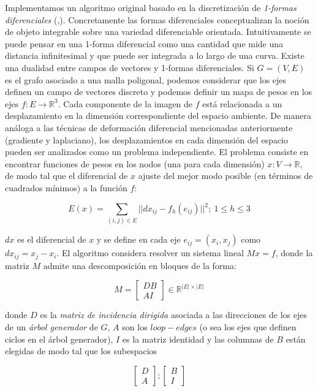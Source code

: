 \documentclass{article}
\begin{document}
Implementamos un algoritmo original basado en la discretización de \emph{1-formas 
diferenciales} (\cite{S:1965},\cite{T:2008}). Concretamente las formas diferenciales 
conceptualizan la noción de objeto integrable sobre una variedad diferenciable 
orientada. Intuitivamente se puede pensar en una 1-forma diferencial como una 
cantidad que mide una distancia infinitesimal y que puede ser integrada a 
lo largo de una curva. Existe una dualidad entre campos de vectores y 1-formas 
diferenciales. Si $G=(V,E)$ es el grafo asociado a una malla poligonal, 
podemos considerar que los ejes definen un campo de vectores discreto y podemos 
definir un mapa de pesos en los ejes $f: E \rightarrow \mathbb{R}^3$. Cada 
componente de la imagen de $f$ está relacionada a un desplazamiento en la 
dimensión correspondiente del espacio ambiente. De manera análoga a las técnicas 
de deformación diferencial mencionadas anteriormente (gradiente y laplaciano), 
los desplazamientos en cada dimensión del espacio pueden ser analizados 
como un problema independiente. El problema consiste en encontrar funciones 
de pesos en los nodos (una para cada dimensión) $x: V \rightarrow \mathbb{R}$, 
de modo tal que el diferencial de $x$ ajuste del mejor modo posible (en 
términos de cuadrados mínimos) a la función $f$:

$$E(x) = \sum_{(i,j) \in E} ||dx_{ij} - f_h(e_{ij})||^2 ; \ 1 \le h \le 3$$

$dx$ es el diferencial de $x$ y se define en cada eje $e_{ij}=(x_i,x_j)$ 
como $dx_{ij} = x_j - x_i$. El algoritmo considera resolver un sistema 
lineal $M x = f$, donde la matriz $M$ admite una descomposición en bloques 
de la forma:

\begin{equation}
     M=\begin{bmatrix}
         D B\\
         A I
	\end{bmatrix} \in \mathbb{R}^{|E| \times |E|}
\end{equation}

donde $D$ es la \emph{matriz de incidencia dirigida} asociada a las direcciones 
de los ejes de un \emph{árbol generador} de $G$, $A$ son los $loop-edges$ 
(o sea los ejes que definen ciclos en el árbol generador), $I$ es la matriz 
identidad y las columnas de $B$ están elegidas de modo tal que los subespacios 

\begin{equation}
     \begin{bmatrix}
         D\\
         A
	\end{bmatrix};
	\begin{bmatrix}
         B\\
         I
	\end{bmatrix}
\end{equation}
\end{document}

